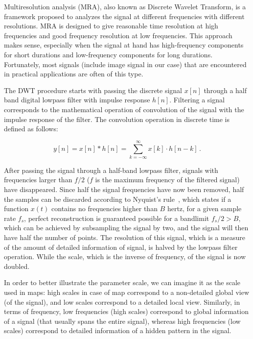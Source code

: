 Multiresolution analysis (MRA), also known as Discrete Wavelet Transform, is a framework proposed to analyzes the signal at different frequencies with different resolutions. MRA is designed to give reasonable time resolution at high frequencies and good frequency resolution at low frequencies. This approach makes sense, especially when the signal at hand has high-frequency components for short durations and low-frequency components for long durations. Fortunately, most signals (include image signal in our case) that are encountered in practical applications are often of this type.

The DWT procedure starts with passing the discrete signal $x[n]$ through a half band digital lowpass filter with impulse response $h[n]$. Filtering a signal corresponds to the mathematical operation of convolution of the signal with the impulse response of the filter. The convolution operation in discrete time is defined as follows:

\begin{equation}
y[n]=x[n] * h[n]=\sum_{k=-\infty}^{\infty} x[k] \cdot h[n-k]\,.
\label{equ:convolude}
\end{equation}

After passing the signal through a half-band lowpass filter, signals with frequencies larger than $f/2$ ($f$ is the maximum frequency of the filtered signal) have disappeared. Since half the signal frequencies have now been removed, half the samples can be discarded according to Nyquist’s rule~\cite{shannon1949communication}, which states if a function $x(t)$ contains no frequencies higher than $B$ hertz, for a given sample rate $f_{s}$, perfect reconstruction is guaranteed possible for a bandlimit  $f_{s}/2>B$, which can be achieved by subsampling the signal by two, and the signal will then have half the number of points. The resolution of this signal, which is a measure of the amount of detailed information of signal, is halved by the lowpass filter operation. While the scale, which is the inverse of frequency, of the signal is now doubled. 

In order to better illustrate the parameter scale, we can imagine it as the scale used in maps: high scales in case of map correspond to a non-detailed global view (of the signal), and low scales correspond to a detailed local view. Similarly, in terms of frequency, low frequencies (high scales) correspond to global information of a signal (that usually spans the entire signal), whereas high frequencies (low scales) correspond to detailed information of a hidden pattern in the signal. 

